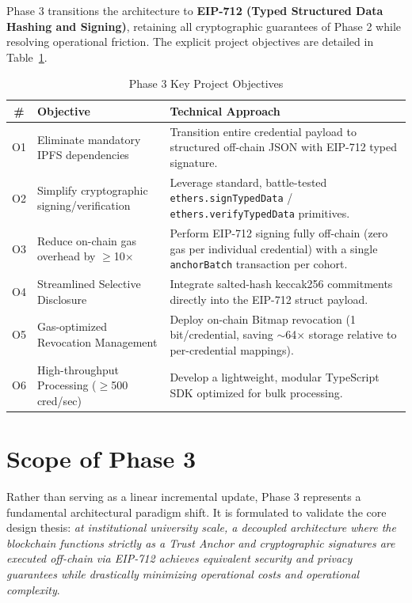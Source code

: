 Phase 3 transitions the architecture to \textbf{EIP-712 (Typed Structured Data Hashing and Signing)}, retaining all cryptographic guarantees of Phase 2 while resolving operational friction. The explicit project objectives are detailed in Table~\ref{tab:objectives}.

\begin{table}[H]
\centering
\renewcommand{\arraystretch}{1.3}
\begin{tabular}{|c|p{5cm}|p{8.5cm}|}
\hline
\textbf{\#} & \textbf{Objective} & \textbf{Technical Approach} \\
\hline
O1 & Eliminate mandatory IPFS dependencies & Transition entire credential payload to structured off-chain JSON with EIP-712 typed signature. \\
\hline
O2 & Simplify cryptographic signing/verification & Leverage standard, battle-tested \texttt{ethers.signTypedData} / \texttt{ethers.verifyTypedData} primitives. \\
\hline
O3 & Reduce on-chain gas overhead by $\geq$10$\times$ & Perform EIP-712 signing fully off-chain (zero gas per individual credential) with a single \texttt{anchorBatch} transaction per cohort. \\
\hline
O4 & Streamlined Selective Disclosure & Integrate salted-hash keccak256 commitments directly into the EIP-712 struct payload. \\
\hline
O5 & Gas-optimized Revocation Management & Deploy on-chain Bitmap revocation (1 bit/credential, saving $\sim$64$\times$ storage relative to per-credential mappings). \\
\hline
O6 & High-throughput Processing ($\geq$500 cred/sec) & Develop a lightweight, modular TypeScript SDK optimized for bulk processing. \\
\hline
\end{tabular}
\caption{Phase 3 Key Project Objectives}
\label{tab:objectives}
\end{table}

\section{Scope of Phase 3}

Rather than serving as a linear incremental update, Phase 3 represents a fundamental architectural paradigm shift. It is formulated to validate the core design thesis: \textit{at institutional university scale, a decoupled architecture where the blockchain functions strictly as a Trust Anchor and cryptographic signatures are executed off-chain via EIP-712 achieves equivalent security and privacy guarantees while drastically minimizing operational costs and operational complexity}.


